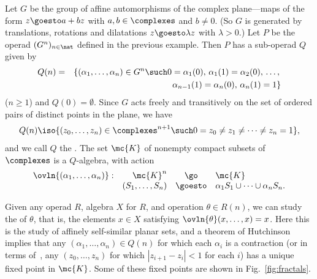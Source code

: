\begin{example}	
Let $G$ be the group of affine automorphisms of the complex plane---maps of
the form $z \goesto a + bz$ with $a, b \in \complexes$ and $b\neq 0$.  (So
$G$ is generated by translations, rotations and dilatations $z \goesto
\lambda z$ with $\lambda> 0$.)  Let $P$ be the operad $(G^n)_{n\in\nat}$
defined in the previous example.  Then $P$ has a sub-operad $Q$ given by
%
\begin{eqnarray*}
Q(n)	&
=	& 
\{
(\alpha_1, \ldots, \alpha_n) \in G^n \such	
0 = \alpha_1(0),\, \alpha_1(1) = \alpha_2(0),\, \ldots,\,
\\&&
\alpha_{n-1}(1) = \alpha_n(0),\, \alpha_n(1) = 1
\}
\end{eqnarray*}
%
($n\geq 1$) and $Q(0) = \emptyset$.  Since $G$ acts freely and transitively
on the set of ordered pairs of distinct points in the plane, we have
%
\begin{equation}	\label{eq:planar-seqs}
Q(n) \iso 
\{
(z_0, \ldots, z_n) \in \complexes^{n+1}
\such
0 = z_0 \neq z_1 \neq \cdots \neq z_n = 1
\},
\end{equation}
%
and we call $Q$ the .  The set
$\mc{K}$ of nonempty compact subsets of $\complexes$ is a $Q$-algebra, with
action
\[
\begin{array}{rrcl}
\ovln{(\alpha_1, \ldots, \alpha_n)}:	&
\mc{K}^n	&
\go	&
\mc{K}	\\
	&
(S_1, \ldots, S_n)	&
\goesto	&
\alpha_1 S_1 \cup \cdots \cup \alpha_n S_n.	\\
\end{array}
\]

Given any operad $R$, algebra $X$ for $R$, and operation $\theta \in R(n)$,
we can study the  of $\theta$, that is, the elements
$x\in X$ satisfying $\ovln{\theta}(x, \ldots, x) = x$.  Here this is the
study of affinely self-similar%
%
%
planar sets, and a theorem of
Hutchinson~\cite{Hut}%
%
%
implies that any $(\alpha_1, \ldots, \alpha_n) \in
Q(n)$ for which each $\alpha_i$ is a contraction (or in terms
of~, any $(z_0, \ldots, z_n)$ for which $|z_{i+1} -
z_i| < 1$ for each $i$) has a unique fixed point in $\mc{K}$.  Some of
these fixed points are shown in Fig.~\ref{fig:fractals}.%
%
%
%
%
%
\end{example}
